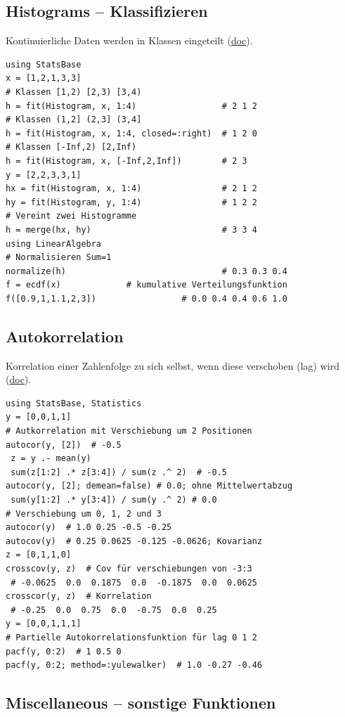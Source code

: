 \documentclass[10pt,twocolumn]{scrartcl}
\begin{document}
\subsection{Histograms -- Klassifizieren}

Kontinuierliche Daten werden in Klassen eingeteilt
(\href{https://juliastats.org/StatsBase.jl/stable/empirical/}{doc}).

\begin{lstlisting}
using StatsBase
x = [1,2,1,3,3]
# Klassen [1,2) [2,3) [3,4)
h = fit(Histogram, x, 1:4)                 # 2 1 2
# Klassen (1,2] (2,3] (3,4]
h = fit(Histogram, x, 1:4, closed=:right)  # 1 2 0
# Klassen [-Inf,2) [2,Inf)
h = fit(Histogram, x, [-Inf,2,Inf])        # 2 3
y = [2,2,3,3,1]
hx = fit(Histogram, x, 1:4)                # 2 1 2
hy = fit(Histogram, y, 1:4)                # 1 2 2
# Vereint zwei Histogramme
h = merge(hx, hy)                          # 3 3 4
using LinearAlgebra
# Normalisieren Sum=1
normalize(h)                               # 0.3 0.3 0.4
f = ecdf(x)             # kumulative Verteilungsfunktion
f([0.9,1,1.1,2,3])                 # 0.0 0.4 0.4 0.6 1.0
\end{lstlisting}

\subsection{Autokorrelation}

Korrelation einer Zahlenfolge zu sich selbst, wenn diese verschoben (lag) wird
(\href{https://juliastats.org/StatsBase.jl/stable/signalcorr/}{doc}).

\begin{lstlisting}
using StatsBase, Statistics
y = [0,0,1,1]
# Autkorrelation mit Verschiebung um 2 Positionen
autocor(y, [2])  # -0.5
 z = y .- mean(y)
 sum(z[1:2] .* z[3:4]) / sum(z .^ 2)  # -0.5
autocor(y, [2]; demean=false) # 0.0; ohne Mittelwertabzug
 sum(y[1:2] .* y[3:4]) / sum(y .^ 2) # 0.0
# Verschiebung um 0, 1, 2 und 3
autocor(y)  # 1.0 0.25 -0.5 -0.25
autocov(y)  # 0.25 0.0625 -0.125 -0.0626; Kovarianz
z = [0,1,1,0]
crosscov(y, z)  # Cov für verschiebungen von -3:3
 # -0.0625  0.0  0.1875  0.0  -0.1875  0.0  0.0625
crosscor(y, z)  # Korrelation
 # -0.25  0.0  0.75  0.0  -0.75  0.0  0.25
y = [0,0,1,1,1]
# Partielle Autokorrelationsfunktion für lag 0 1 2
pacf(y, 0:2)  # 1 0.5 0
pacf(y, 0:2; method=:yulewalker)  # 1.0 -0.27 -0.46
\end{lstlisting}

\subsection{Miscellaneous -- sonstige Funktionen}
\end{document}
